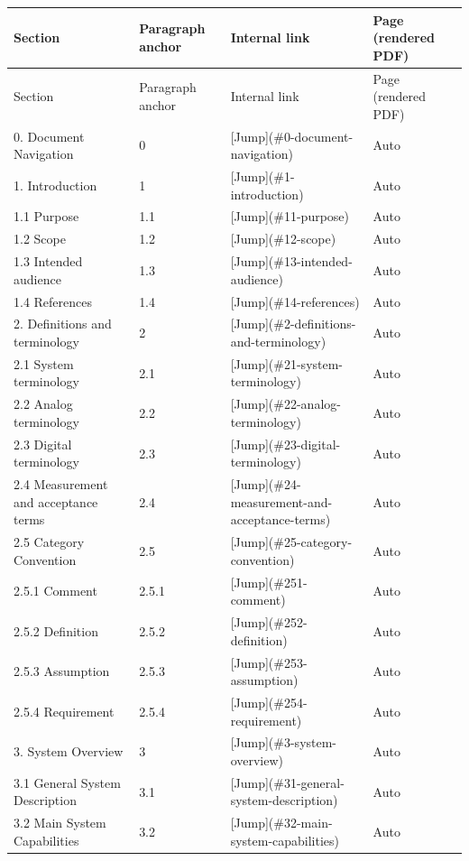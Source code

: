 \documentclass[11pt]{article}
\begin{document}
\begin{longtable}{|p{}|p{}|p{}|p{}|}
\hline
Section & Paragraph anchor & Internal link & Page (rendered PDF) \\
\hline
\endfirsthead
\hline
Section & Paragraph anchor & Internal link & Page (rendered PDF) \\
\hline
\endhead
0. Document Navigation & 0 & [Jump](\#0-document-navigation) & Auto \\
\hline
1. Introduction & 1 & [Jump](\#1-introduction) & Auto \\
\hline
1.1 Purpose & 1.1 & [Jump](\#11-purpose) & Auto \\
\hline
1.2 Scope & 1.2 & [Jump](\#12-scope) & Auto \\
\hline
1.3 Intended audience & 1.3 & [Jump](\#13-intended-audience) & Auto \\
\hline
1.4 References & 1.4 & [Jump](\#14-references) & Auto \\
\hline
2. Definitions and terminology & 2 & [Jump](\#2-definitions-and-terminology) & Auto \\
\hline
2.1 System terminology & 2.1 & [Jump](\#21-system-terminology) & Auto \\
\hline
2.2 Analog terminology & 2.2 & [Jump](\#22-analog-terminology) & Auto \\
\hline
2.3 Digital terminology & 2.3 & [Jump](\#23-digital-terminology) & Auto \\
\hline
2.4 Measurement and acceptance terms & 2.4 & [Jump](\#24-measurement-and-acceptance-terms) & Auto \\
\hline
2.5 Category Convention & 2.5 & [Jump](\#25-category-convention) & Auto \\
\hline
2.5.1 Comment & 2.5.1 & [Jump](\#251-comment) & Auto \\
\hline
2.5.2 Definition & 2.5.2 & [Jump](\#252-definition) & Auto \\
\hline
2.5.3 Assumption & 2.5.3 & [Jump](\#253-assumption) & Auto \\
\hline
2.5.4 Requirement & 2.5.4 & [Jump](\#254-requirement) & Auto \\
\hline
3. System Overview & 3 & [Jump](\#3-system-overview) & Auto \\
\hline
3.1 General System Description & 3.1 & [Jump](\#31-general-system-description) & Auto \\
\hline
3.2 Main System Capabilities & 3.2 & [Jump](\#32-main-system-capabilities) & Auto \\

\end{longtable}
\end{document}
